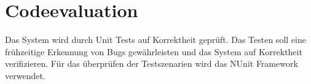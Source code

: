 \section{Codeevaluation}

Das System wird durch Unit Tests auf Korrektheit geprüft. Das Testen soll eine frühzeitige Erkennung von Bugs gewährleisten und das System auf Korrektheit verifizieren. Für das überprüfen der Testszenarien wird das NUnit Framework verwendet. 
